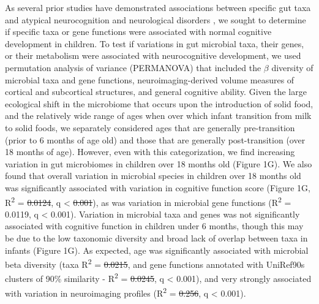 \documentclass{article}
\providecommand{\DIFadd}[1]{{\protect\color{blue}\uwave{#1}}} %
\providecommand{\DIFdel}[1]{{\protect\color{red}\sout{#1}}}                      %
\providecommand{\DIFaddbegin}{} %
\providecommand{\DIFaddend}{} %
\providecommand{\DIFdelbegin}{} %
\providecommand{\DIFdelend}{} %
\newcommand{\DIFscaledelfig}{0.5}
\newlength{\DIFdelgraphicswidth} %
\newlength{\DIFdelgraphicsheight} %
\newcommand{\DIFaddincludegraphics}[2][]{{\color{blue}\fbox{\DIFOincludegraphics[#1]{#2}}}} %
\newcommand{\DIFdelincludegraphics}[2][]{%
\sbox{\DIFdelgraphicsbox}{\DIFOincludegraphics[#1]{#2}}%
\settoboxwidth{\DIFdelgraphicswidth}{\DIFdelgraphicsbox} %
\settoboxtotalheight{\DIFdelgraphicsheight}{\DIFdelgraphicsbox} %
\scalebox{\DIFscaledelfig}{%
\parbox[b]{\DIFdelgraphicswidth}{\usebox{\DIFdelgraphicsbox}\\[-\baselineskip] \rule{\DIFdelgraphicswidth}{0em}}\llap{\resizebox{\DIFdelgraphicswidth}{\DIFdelgraphicsheight}{%
\setlength{\unitlength}{\DIFdelgraphicswidth}%
\begin{picture}(1,1)%
\thicklines\linethickness{2pt} %
{\color[rgb]{1,0,0}\put(0,0){\framebox(1,1){}}}%
{\color[rgb]{1,0,0}\put(0,0){\line( 1,1){1}}}%
{\color[rgb]{1,0,0}\put(0,1){\line(1,-1){1}}}%
\end{picture}%
}\hspace*{3pt}}} %
} %
\DeclareRobustCommand{\DIFaddbegin}{\DIFOaddbegin \let\includegraphics\DIFaddincludegraphics} %
\DeclareRobustCommand{\DIFaddend}{\DIFOaddend \let\includegraphics\DIFOincludegraphics} %
\DeclareRobustCommand{\DIFdelbegin}{\DIFOdelbegin \let\includegraphics\DIFdelincludegraphics} %
\DeclareRobustCommand{\DIFdelend}{\DIFOaddend \let\includegraphics\DIFOincludegraphics} %
\begin{document}
As several prior studies have demonstrated associations between specific gut taxa
and atypical neurocognition and neurological disorders
\cite{liuAlteredGutMicrobiota2019,wanUnderdevelopmentGutMicrobiota2021,
      magnussonRelationshipsDietrelatedChanges2015,mayneris-perxachsMicrobiotaAlterationsProline2022,
      needhamGutderivedMetaboliteAlters2022},
we sought to determine if specific taxa or gene functions were associated
with normal cognitive development in children.
To test if variations in gut microbial taxa,
their genes, or their metabolism were associated with neurocognitive
development, we used permutation analysis of variance (PERMANOVA) 
that included the $\beta$ diversity of microbial taxa and gene functions,
neuroimaging-derived volume measures of cortical and subcortical structures,
and general cognitive ability.
Given the large ecological shift in the microbiome that occurs upon the introduction of solid food,
and the relatively wide range of ages when over which infant transition from milk to solid foods,
we separately considered ages that are generally pre-transition (prior to 6 months of age old)
and those that are generally post-transition (over 18 months of age).
However, even with this categorization, we find increasing variation
in gut microbiomes in children over 18 months old (Figure 1G).
We also found that overall variation in microbial species in children over 18 months old
was significantly associated with variation in cognitive function score
(Figure 1G, R\textsuperscript{2} = \DIFdelbegin \DIFdel{0.0124}\DIFdelend \DIFaddbegin \DIFadd{0.0099}\DIFaddend , q \textless{} \DIFdelbegin \DIFdel{0.001}\DIFdelend \DIFaddbegin \DIFadd{0.01}\DIFaddend ),
as was variation in microbial gene functions (R\textsuperscript{2} = 0.0119, q \textless{} 0.001).
Variation in microbial taxa and genes was not significantly associated with cognitive
function in children under 6 months, though this may be due to the low
taxonomic diversity and broad lack of overlap between taxa in infants (Figure 1G).
As expected, age was significantly associated with microbial beta
diversity (taxa R\textsuperscript{2} = \DIFdelbegin \DIFdel{0.0215}\DIFdelend \DIFaddbegin \DIFadd{0.0207}\DIFaddend , and  gene functions
annotated with UniRef90s clusters of 90\% similarity
\cite{suzekUniRefComprehensiveNonredundant2007} -
R\textsuperscript{2} = \DIFdelbegin \DIFdel{0.0245}\DIFdelend \DIFaddbegin \DIFadd{0.0263}\DIFaddend , q \textless{} 0.001), and very strongly
associated with variation in neuroimaging \DIFaddbegin \DIFadd{(MRI) }\DIFaddend profiles (R\textsuperscript{2} = \DIFdelbegin \DIFdel{0.256}\DIFdelend \DIFaddbegin \DIFadd{0.258}\DIFaddend , q
\textless{} 0.001).
\end{document}
